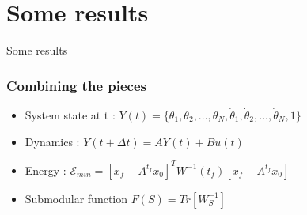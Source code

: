 \documentclass[xcolor=dvipsnames]{beamer}
\begin{document}
\section{Some results}
\begin{frame}
	\begin{huge}
		\begin{center}
			Some results
		\end{center}
	\end{huge}
\end{frame}

\begin{frame}
	\frametitle{Combining the pieces}

	\begin{itemize}
				\item System state at t : $ Y(t) = \{ \theta_1,\theta_2,...,\theta_N,\dot{\theta}_1,\dot{\theta}_2,...,\dot{\theta}_N,1\} $
				\item Dynamics : $ Y(t+\Delta t) = A Y(t) + B u(t) $
				\item Energy : $ \mathcal{E}_{min}= \left[ x_f - A^{t_f}x_0 \right]^{T}W^{-1}(t_f)\left[ x_f - A^{t_f}x_0 \right] $
				\item Submodular function $F(S) = Tr[W_S^{-1}]$
	\end{itemize}
	
	\begin{columns}
		\begin{column}{.4\textwidth}
			

\end{column}
\end{columns}
\end{frame}
\end{document}
